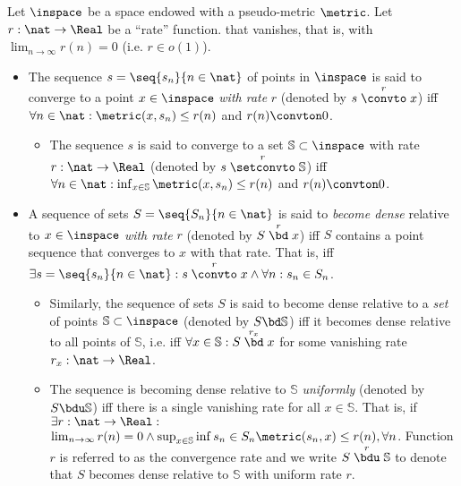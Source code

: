 \begin{defn} 
Let $\inspace$ be a space endowed with a pseudo-metric $\metric$. 
Let $r:\nat \to \Real$ be a ``rate'' function. 
that vanishes, that is, with $\lim_{n \to \infty} r(n) = 0$ (i.e. $r \in o(1)$).
\begin{itemize}
\item The sequence $s =\seq{s_n}{n \in \nat}$ of points in $\inspace$ is said to converge to a point $x \in \inspace$ \emph{with rate} $r$ (denoted by $s \stackrel{r} \convto x$) iff  $\forall n \in \nat : \metric(x,s_n) \leq r(n)$ and $r(n) \convton 0$. 
\begin{itemize}
\item The sequence $s $ is said to converge to a set $\mathbb S \subset \inspace$  with rate $r:\nat \to \Real$ (denoted by $s \stackrel{r} \setconvto \mathbb S$) iff $\forall n\in \nat : \inf_{x \in \mathbb S}\metric(x,s_n) \leq r(n)$ and $r(n) \convton 0$. 
\end{itemize}
\item A sequence of sets $S = \seq{S_n}{n \in \nat}$ is said to \emph{become dense} relative to $x \in \inspace$  \emph{with rate} $r$ (denoted by $S \stackrel{r}{\bd} x$) iff $S$ contains a point sequence that converges to $x$ with that rate. That is, iff $\exists s= \seq{s_n}{n\in \nat}: s \stackrel{r}\convto x \wedge \forall n: s_n \in S_n$. 
\begin{itemize}
\item Similarly, the sequence of sets $S$ is said to become dense relative to a \emph{set}  of points $\mathbb S \subset \inspace $ (denoted by $S \bd \mathbb S$) iff it becomes dense relative to all points of $\mathbb S$, i.e. iff $\forall x \in \mathbb S : S \stackrel{r_x}{\bd} x$ for some vanishing rate $r_x : \nat \to \Real$. 
\item The sequence is becoming dense relative to $\mathbb S$ \emph{uniformly} (denoted by $S \bdu \mathbb S$) iff there is a single vanishing rate for all $x \in \mathbb S$. That is, if $\exists r:\nat \to \Real:$ $\lim_{n\to \infty} r(n) =0 \wedge \sup_{x \in \mathbb S} \inf{s_n \in S_n} \metric(s_n,x) \leq r(n), \forall n$. Function $r$ is referred to as the convergence rate and we write $S \stackrel{r}{\bdu}\mathbb S$ to denote that $S$ becomes dense relative to $\mathbb S$ with uniform rate $r$.
\end{itemize}
\end{itemize}
\end{defn}

